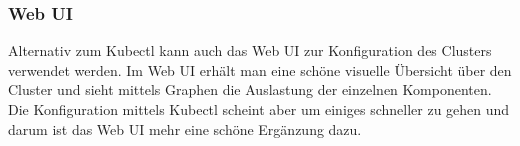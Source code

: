 \subsubsection{Web UI}
Alternativ zum Kubectl kann auch das Web UI zur Konfiguration des Clusters verwendet werden. Im Web UI erhält man eine schöne visuelle Übersicht über den Cluster und sieht mittels Graphen die Auslastung der einzelnen Komponenten. Die Konfiguration mittels Kubectl scheint aber um einiges schneller zu gehen und darum ist das Web UI mehr eine schöne Ergänzung dazu. \cite{kubernetes}
\clearpage
